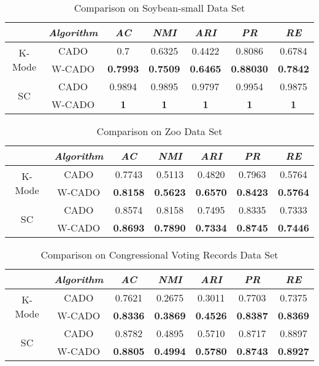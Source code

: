 \documentclass[review]{elsarticle}
\begin{document}
\begin{table}[!h]\tabcolsep=0.065in
\centering
\caption{Comparison on Soybean-small Data Set}
\small
\label{tab:Comparison on Soybean-small Data Set}
\begin{tabular}{c|c|c|c|c|c|c}
\hline
\emph{}&\emph{Algorithm}&\emph{AC}&\emph{NMI}&\emph{ARI}&\emph{PR}&\emph{RE} \\
\hline
\multirow{2}{*}{K-Mode} & CADO & 0.7  & 0.6325  & 0.4422  & 0.8086  & 0.6784 \\
    \cline{2-7}
    & W-CADO & \textbf{0.7993} & \textbf{0.7509} & \textbf{0.6465} & \textbf{0.88030} & \textbf{0.7842}\\
    \hline
\multirow{2}{*}{SC} & CADO & 0.9894 & 0.9895 & 0.9797 & 0.9954 & 0.9875\\
    \cline{2-7}
    & W-CADO & \textbf{1} & \textbf{1} & \textbf{1} & \textbf{1} & \textbf{1}\\
\hline
\end{tabular}
\end{table}

\begin{table}[!h]\tabcolsep=0.065in
\centering
\caption{Comparison on Zoo Data Set}
\small
\label{tab:Comparison on Zoo Data Set}
\begin{tabular}{c|c|c|c|c|c|c}
\hline
\emph{}&\emph{Algorithm}&\emph{AC}&\emph{NMI}&\emph{ARI}&\emph{PR}&\emph{RE} \\
\hline
\multirow{2}{*}{K-Mode} & CADO & 0.7743 & 0.5113 & 0.4820 & 0.7963 & 0.5764\\
    \cline{2-7}
    & W-CADO & \textbf{0.8158} & \textbf{0.5623} & \textbf{0.6570} & \textbf{0.8423} & \textbf{0.5764}\\
    \hline
\multirow{2}{*}{SC} & CADO & 0.8574 & 0.8158 & 0.7495 & 0.8335 & 0.7333\\
    \cline{2-7}
    & W-CADO & \textbf{0.8693} & \textbf{0.7890} & \textbf{0.7334} & \textbf{0.8745} & \textbf{0.7446}\\
\hline
\end{tabular}
\end{table}

\begin{table}[!h]\tabcolsep=0.065in
\centering
\caption{Comparison on Congressional Voting Records Data Set}
\small
\label{tab:Comparison on Congressional Voting Records Data Set}
\begin{tabular}{c|c|c|c|c|c|c}
\hline
\emph{}&\emph{Algorithm}&\emph{AC}&\emph{NMI}&\emph{ARI}&\emph{PR}&\emph{RE} \\
\hline
\multirow{2}{*}{K-Mode} & CADO & 0.7621 & 0.2675 & 0.3011 & 0.7703 & 0.7375\\
    \cline{2-7}
    & W-CADO & \textbf{0.8336} & \textbf{0.3869} & \textbf{0.4526} & \textbf{0.8387} & \textbf{0.8369}\\
    \hline
\multirow{2}{*}{SC} & CADO & 0.8782 & 0.4895 & 0.5710 & 0.8717 & 0.8897\\
    \cline{2-7}
    & W-CADO & \textbf{0.8805} & \textbf{0.4994} & \textbf{0.5780} & \textbf{0.8743} & \textbf{0.8927}\\
\hline
\end{tabular}
\end{table}
\end{document}
